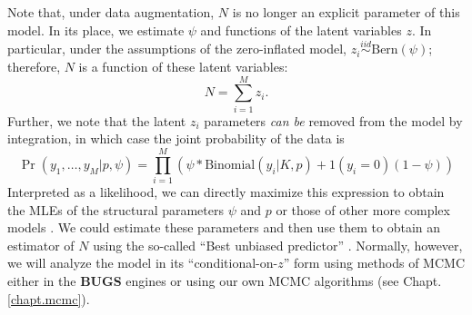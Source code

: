 Note that, under data augmentation, $N$ is no longer an explicit
parameter of this model. In its place, we estimate $\psi$ and
functions of the latent variables $z$. In particular, under the
assumptions of the zero-inflated model, $z_{i} \stackrel{iid}{\sim}
\mbox{Bern}(\psi)$; therefore, $N$ is a function of these latent
variables:
 \[
 N = \sum_{i=1}^{M} z_{i}.
\]
Further, we note that the latent $z_i$ parameters {\it can be} removed
 from
the model by integration, in which case the joint probability of the
data is
\begin{equation}
  \Pr(y_1, \ldots, y_M | p, \psi) = \prod_{i=1}^M  \left( 
\psi *\mathrm{Binomial}(y_i | K, p) +  1(y_i=0) (1-\psi) \right)
\end{equation}
Interpreted as a likelihood, we can directly maximize this expression
to obtain the MLEs of the structural parameters $\psi$ and $p$ or
those of other more complex models \citep[e.g., see][]{royle:2006}. We
could estimate these parameters and then use them to obtain an
estimator of $N$ using the so-called ``Best unbiased predictor''
\citep[see][]{royle_dorazio:2012}. Normally, however, we will analyze
the model in its ``conditional-on-$z$'' form using methods of MCMC
either in the {\bf BUGS} engines or using our own MCMC algorithms (see
Chapt. \ref{chapt.mcmc}).

